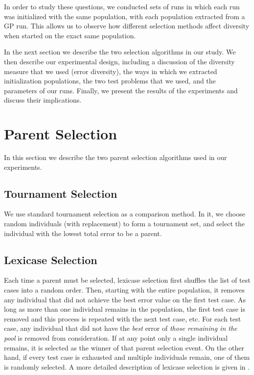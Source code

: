 \documentclass{sig-alternate-05-2015}
\begin{document}
In order to study these questions, we conducted sets of runs in which each run was initialized with the same population, with each population extracted from a GP run. This allows us to observe how different selection methods affect diversity when started on the exact same population.

In the next section we describe the two selection algorithms in our study. We then describe our experimental design, including a discussion of the diversity measure that we used (error diversity), the ways in which we extracted initialization populations, the two test problems that we used, and the parameters of our runs. Finally, we present the results of the experiments and discuss their implications.


\section{Parent Selection}

In this section we describe the two parent selection algorithms used in our experiments.

\subsection{Tournament Selection}

We use standard tournament selection as a comparison method. In it, we choose random individuals (with replacement) to form a tournament set, and select the individual with the lowest total error to be a parent.

%

\subsection{Lexicase Selection}

Each time a parent must be selected, lexicase selection first shuffles the list of test cases into a random order. Then, starting with the entire population, it removes any individual that did not achieve the best error value on the first test case. As long as more than one individual remains in the population, the first test case is removed and this process is repeated with the next test case, etc. For each test case, any individual that did not have the \textit{best} error of \textit{those remaining in the pool} is removed from consideration. If at any point only a single individual remains, it is selected as the winner of that parent selection event. On the other hand, if every test case is exhausted and multiple individuals remain, one of them is randomly selected. A more detailed description of lexicase selection is given in \cite{Helmuth:2015:ieeeTEC}.
\end{document}
